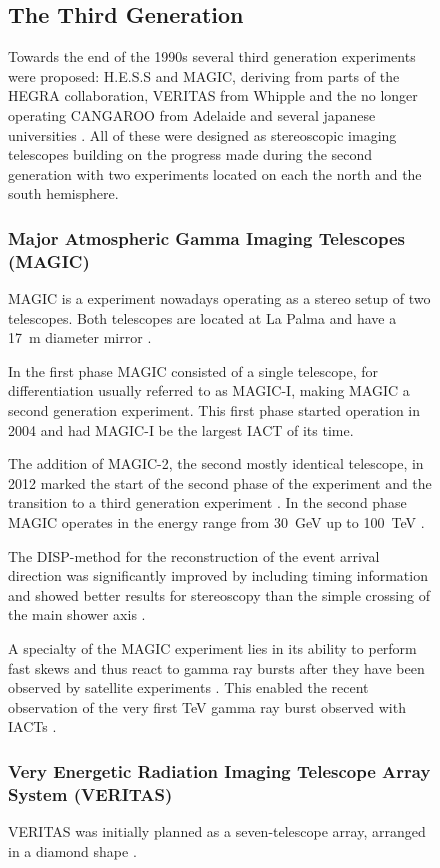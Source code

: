 \begin{figure}
\subsection{The Third Generation}

Towards the end of the 1990s several third generation experiments were
proposed:
H.E.S.S and MAGIC, deriving from parts of the HEGRA collaboration, 
VERITAS from Whipple and the no longer operating CANGAROO from Adelaide and 
several japanese universities \cite{HILLAS201319}. All of these
were designed as stereoscopic imaging telescopes building on the progress made during the 
second generation with two experiments located on each the north and the south hemisphere.

\subsubsection{Major Atmospheric Gamma Imaging Telescopes (MAGIC)}
MAGIC is a experiment nowadays operating as a stereo setup of two telescopes.
Both telescopes are located at La Palma and have a \SI{17}{\meter} diameter mirror \cite{ALEKSIC201676}.

In the first phase MAGIC consisted of a single telescope, for differentiation usually
referred to as MAGIC-I, making MAGIC a second generation experiment. This first phase started 
operation in 2004 and had MAGIC-I be the largest IACT of its time.

The addition of MAGIC-2, the second mostly identical telescope, in 2012 marked the 
start of the second phase of the experiment and the transition to a third 
generation experiment \cite{2009arXiv0907.1211C}.
In the second phase MAGIC operates in the energy range from \SI{30}{\giga\eV}
up to \SI{100}{\TeV} \cite{magic_website}.

The DISP-method for the reconstruction of the event arrival direction 
was significantly improved by including timing information and showed better 
results for stereoscopy than the simple crossing of the main shower axis \cite{ALEKSIC2012435}.

A specialty of the MAGIC experiment lies in its ability to 
perform fast skews and thus react to gamma ray bursts after they have been observed 
by satellite experiments \cite{2003ICRC....5.2943B}.
This enabled the recent observation of the very first \si{\TeV}
gamma ray burst observed with IACTs \cite{collaboration2019teraelectronvolt}.


\subsubsection{Very Energetic Radiation Imaging Telescope Array System (VERITAS)}
VERITAS	was initially planned as a seven-telescope array, arranged in a diamond shape
\cite{WEEKES2002221}.


\end{figure}
